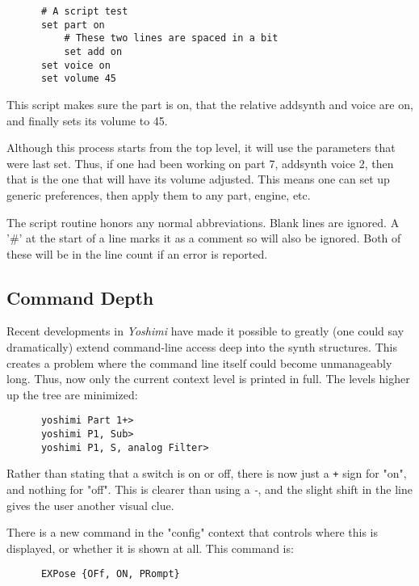    \begin{verbatim}
      # A script test
      set part on
          # These two lines are spaced in a bit
          set add on
      set voice on
      set volume 45
   \end{verbatim}

   This script makes sure the part is on, that the relative addsynth and voice
   are on, and finally sets its volume to 45.

   Although this process starts from the top level, it will use the parameters
   that were last set.
   Thus, if one had been working on part 7, addsynth voice 2,
   then that is the one that will have its volume adjusted.
   This means one can set up generic preferences,
   then apply them to any part, engine, etc.

   The script routine honors any normal abbreviations.
   Blank lines are ignored.
   A '#' at the start of a line marks it as a comment so will also be ignored.
   Both of these will be in the line count if an error is reported.

\subsection{Command Depth}
\label{subsec:command_line_command_depth}

   Recent developments in \textsl{Yoshimi} have made it possible to greatly
   (one could say dramatically) extend command-line access deep into
   the synth structures.
   This creates a problem where the command line itself could become
   unmanageably long.
   Thus, now only the current context level is printed in full.
   The levels higher up the tree are minimized:

   \begin{verbatim}
      yoshimi Part 1+>
      yoshimi P1, Sub>
      yoshimi P1, S, analog Filter>
   \end{verbatim}

   Rather than stating that a switch is on or off,
   there is now just a \texttt{+} sign for "on", and nothing for "off".
   This is clearer than using a \textsl{-}, and the
   slight shift in the line gives the user another visual clue.

   There is a new command in the "config" context that controls where this is
   displayed, or whether it is shown at all.
   This command is:

   \begin{verbatim}
      EXPose {OFf, ON, PRompt}
   \end{verbatim}


